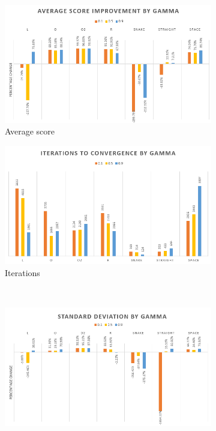 \documentclass[12pt, letter]{article}
\begin{document}
\begin{figure}[h!] 
\renewcommand\thesubfigure{\roman{subfigure}}
    \centering
    \begin{subfigure}[b]{0.49\textwidth}
        \includegraphics[width=1\textwidth]{img/gamma/AvgScore}
        \caption{Average score}
    \end{subfigure}
    \begin{subfigure}[b]{0.49\textwidth}
        \includegraphics[width=1\textwidth]{img/gamma/Iter}
        \caption{Iterations}
    \end{subfigure}
    \\
    \begin{subfigure}[b]{0.49\textwidth}
        \includegraphics[width=1\textwidth]{img/gamma/StDev}

\end{subfigure}
\end{figure}
\end{document}
